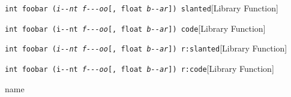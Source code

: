 \documentclass{book}
\begin{document}
%
\noindent\texttt{int foobar (\textsl{i{-}{-}nt} \textsl{f{-}{-}{-}oo}[, float \textsl{b{-}{-}ar}]) slanted}\hfill[Library Function]



%
\noindent\texttt{int foobar (\texttt{i{-}{-}nt} \textsl{f{-}{-}{-}oo}[, float \textsl{b{-}{-}ar}]) code}\hfill[Library Function]



%
\noindent\texttt{int foobar (\textnormal{\textsl{i{-}{-}nt}} \textsl{f{-}{-}{-}oo}[, float \textsl{b{-}{-}ar}]) r:slanted}\hfill[Library Function]



%
\noindent\texttt{int foobar (\textnormal{\texttt{i{-}{-}nt}} \textsl{f{-}{-}{-}oo}[, float \textsl{b{-}{-}ar}]) r:code}\hfill[Library Function]



%
name
\end{document}

